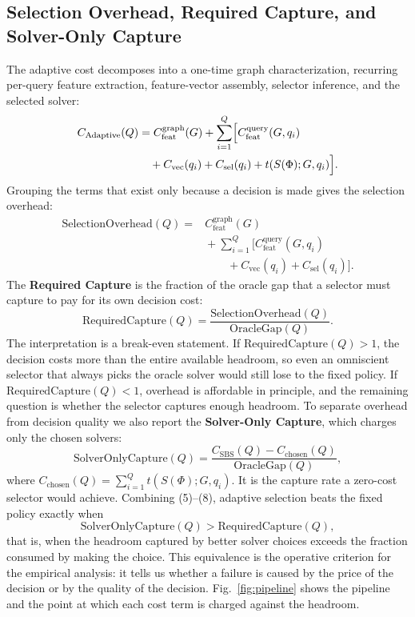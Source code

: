 \documentclass[conference]{IEEEtran}
\begin{document}
\subsection{Selection Overhead, Required Capture, and Solver-Only Capture}
The adaptive cost decomposes into a one-time graph characterization, recurring per-query feature extraction, feature-vector assembly, selector inference, and the selected solver:
\begin{equation}
\begin{aligned}
C_{\mathrm{Adaptive}}(Q) &= C_{\mathrm{feat}}^{\mathrm{graph}}(G) + \sum_{i=1}^{Q}\Bigl[ C_{\mathrm{feat}}^{\mathrm{query}}(G,q_i) \\
&\quad + C_{\mathrm{vec}}(q_i) + C_{\mathrm{sel}}(q_i) + t(S(\Phi);G,q_i)\Bigr].
\end{aligned}
\end{equation}
Grouping the terms that exist only because a decision is made gives the selection overhead:
\begin{equation}
\begin{aligned}
\mathrm{SelectionOverhead}(Q) ={}& C_{\mathrm{feat}}^{\mathrm{graph}}(G) \\
&{}+ \sum_{i=1}^{Q}\bigl[ C_{\mathrm{feat}}^{\mathrm{query}}(G,q_i) \\
&{}\qquad + C_{\mathrm{vec}}(q_i) + C_{\mathrm{sel}}(q_i)\bigr].
\end{aligned}
\end{equation}
The \textbf{Required Capture} is the fraction of the oracle gap that a selector must capture to pay for its own decision cost:
\begin{equation}
\mathrm{RequiredCapture}(Q) = \frac{\mathrm{SelectionOverhead}(Q)}{\mathrm{OracleGap}(Q)} .
\end{equation}
The interpretation is a break-even statement. If $\mathrm{RequiredCapture}(Q) > 1$, the decision costs more than the entire available headroom, so even an omniscient selector that always picks the oracle solver would still lose to the fixed policy. If $\mathrm{RequiredCapture}(Q) < 1$, overhead is affordable in principle, and the remaining question is whether the selector captures enough headroom. To separate overhead from decision quality we also report the \textbf{Solver-Only Capture}, which charges only the chosen solvers:
\begin{equation}
\mathrm{SolverOnlyCapture}(Q) = \frac{C_{\mathrm{SBS}}(Q) - C_{\mathrm{chosen}}(Q)}{\mathrm{OracleGap}(Q)},
\end{equation}
where $C_{\mathrm{chosen}}(Q)=\sum_{i=1}^{Q} t(S(\Phi);G,q_i)$. It is the capture rate a zero-cost selector would achieve. Combining (5)--(8), adaptive selection beats the fixed policy exactly when
\begin{equation}
\mathrm{SolverOnlyCapture}(Q) > \mathrm{RequiredCapture}(Q),
\end{equation}
that is, when the headroom captured by better solver choices exceeds the fraction consumed by making the choice. This equivalence is the operative criterion for the empirical analysis: it tells us whether a failure is caused by the price of the decision or by the quality of the decision. Fig.~\ref{fig:pipeline} shows the pipeline and the point at which each cost term is charged against the headroom.
\end{document}
